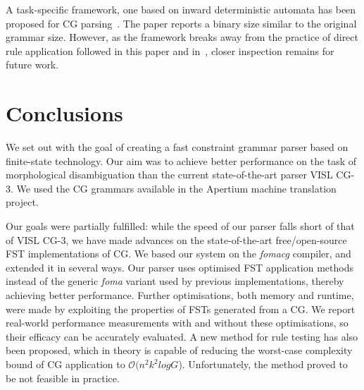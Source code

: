 \documentclass[11pt]{article}
\begin{document}
A task-specific framework, one based on inward deterministic automata has
been proposed for CG parsing~\cite{Yli-Jyra:2011}. The paper reports a binary
size similar to the original grammar size. However, as the framework breaks away
from the practice of direct rule application followed in this paper and
in~\cite{Hulden:2011,Peltonen:2011}, closer inspection remains for future work. 


\section{Conclusions}
\label{sec:conclusion}
We set out with the goal of creating a fast constraint grammar parser based on
finite-state technology. Our aim was to achieve better performance on the task
of morphological disambiguation than the current state-of-the-art parser
VISL CG-3. We used the CG grammars available in the Apertium machine translation
project.

Our goals were partially fulfilled: while the speed of our parser falls short
of that of VISL CG-3, we have made advances on the state-of-the-art
free/open-source FST implementations of CG. We based our system on the
\emph{fomacg} compiler, and extended it in several ways. Our parser  %
uses optimised FST application methods instead of the generic \emph{foma} variant
used by previous implementations, thereby achieving better performance.
Further optimisations, both memory and runtime, were made
by exploiting the properties of FSTs generated from a CG. We report real-world
performance measurements with and without these optimisations, so their efficacy
can be accurately evaluated.
A new method for rule testing has also been proposed, which in theory is capable
of reducing the worst-case complexity bound of CG application to
$\mathcal{O}(n^2k^2logG$). Unfortunately, the method proved to be not feasible in
practice.
\end{document}
